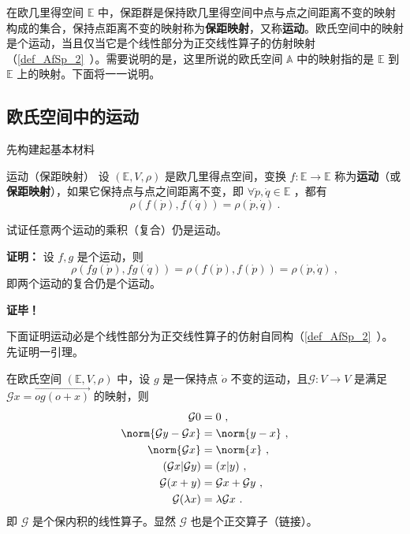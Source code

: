 
在欧几里得空间 $\mathbb E$ 中，保距群是保持欧几里得空间中点与点之间距离不变的映射构成的集合，保持点距离不变的映射称为\textbf{保距映射}，又称\textbf{运动}。欧氏空间中的映射是个运动，当且仅当它是个线性部分为正交线性算子的仿射映射（\autoref{def_AfSp_2}~）。需要说明的是，这里所说的欧氏空间 $\mathbb A$ 中的映射指的是 $\mathbb E$ 到 $\mathbb E$ 上的映射。下面将一一说明。
\subsection{欧氏空间中的运动}
先构建起基本材料
\begin{definition}{运动（保距映射）}
设 $(\mathbb E,V,\rho)$ 是欧几里得点空间，变换 $f:\mathbb E\rightarrow\mathbb E$ 称为\textbf{运动}（或\textbf{保距映射}），如果它保持点与点之间距离不变，即 $\forall \dot p,\dot q\in\mathbb E$ ，都有
\begin{equation}
\rho(f(\dot p),f(\dot q))=\rho(\dot p,\dot q)~.
\end{equation}
\end{definition}
\begin{example}{}\label{ex_CDQ2Ec_1}
试证任意两个运动的乘积（复合）仍是运动。

\textbf{证明：}
设 $f,g$ 是个运动，则
\begin{equation}
\rho(fg(\dot p),fg(\dot q))=\rho(f(\dot p),f(\dot p))=\rho(\dot p,\dot q)~,
\end{equation}
即两个运动的复合仍是个运动。

\textbf{证毕！}
\end{example}
下面证明运动必是个线性部分为正交线性算子的仿射自同构（\autoref{def_AfSp_2}~）。先证明一引理。
\begin{lemma}{}\label{lem_CDQ2Ec_1}
在欧氏空间 $(\mathbb E,V,\rho)$ 中，设 $g$ 是一保持点 $\dot o$ 不变的运动，且$\mathcal G:V\rightarrow V$ 是满足 $\mathcal G x=\overrightarrow{og(o+x)}$ 的映射，则
\begin{equation}
\begin{aligned}
\mathcal G 0&=0~,\\
\norm{\mathcal Gy-\mathcal Gx}&=\norm{y-x}~,\\
\norm{\mathcal G x}&=\norm{x}~,\\
(\mathcal G x|\mathcal G y)&=(x|y)~,\\
\mathcal G(x+y)&=\mathcal G x+\mathcal G y~,\\
\mathcal G(\lambda x)&=\lambda\mathcal G x~.
\end{aligned}
\end{equation}
即 $\mathcal G$ 是个保内积的线性算子。显然 $\mathcal G$ 也是个正交算子（链接）。
\end{lemma}

